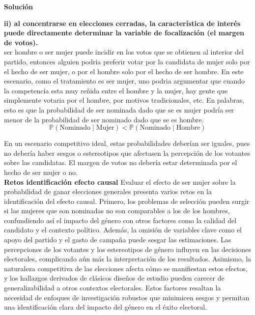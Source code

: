 \documentclass[a4paper, answers, addpoints, 11pt]{exam}
\newenvironment{solucion}{%
  \begin{mdframed}[
    backgroundcolor=blue!5,    %
    linecolor=blue!50,          %
    linewidth=2pt,              %
    leftmargin=10pt,            %
    rightmargin=8pt,           %
    topline=true,              %
    bottomline=true,            %
    roundcorner=10pt,           %
    innerleftmargin=10pt,       %
    innerrightmargin=10pt,      %
    innerbottommargin=10pt,     %
    innertopmargin=10pt         %
  ]%
  \begin{tcolorbox}[colframe=blue!50!black, colback=blue!50, coltitle=white, sharp corners=all, boxrule=1mm, width=\textwidth, halign=left, valign=center, top=0mm, bottom=0mm, left=0mm, right=0mm] \textbf{Solución} \end{tcolorbox} }{\end{mdframed}}
\begin{document}
\begin{enumerate}[resume]
\begin{solucion}
\textbf{ii) al concentrarse en elecciones cerradas, la característica de interés puede directamente
determinar la variable de focalización (el margen de votos).}\\
ser hombre o ser mujer puede incidir en los votos que se obtienen al interior del partido, entonces alguien podria preferir votar por la candidata de mujer solo por el hecho de ser mujer, o por el hombre solo por el hecho de ser hombre. En este escenario, como el tratamiento es ser mujer, uno podria argumentar que cuando la competencia esta muy reñida entre el hombre y la mujer, hay gente que simplemente votaria por el hombre, por motivos tradicionales, etc. En palabras, esto es que la probabilidad de ser nominada dado que se es mujer podría ser menor de la probabilidad de ser nominado dado que se es hombre.  \[
    \mathbb{P}(\text{Nominado} \mid \text{Mujer}) < \mathbb{P}(\text{Nominado} \mid \text{Hombre})
    \]

En un escenario competitivo ideal, estas probabilidades deberían ser iguales, pues no debería haber sesgos o estereotipos que afectasen la percepción de los votantes sobre las candidatas.  El margen de votos no debería estar determinada por el hecho de ser mujer o no.\\ 


\textbf{Retos identificación efecto causal}
 Evaluar el efecto de ser mujer sobre la probabilidad de ganar elecciones generales presenta varios retos en la identificación del efecto causal. Primero, los problemas de selección pueden surgir si las mujeres que son nominadas  no son comparables a los de los hombres, confundiendo así el impacto del género con otros factores como la calidad del candidato y el contexto político. Además, la omisión de variables clave como el apoyo del partido y el gasto de campaña puede sesgar las estimaciones. Las percepciones de los votantes y los estereotipos de género influyen en las decisiones electorales, complicando aún más la interpretación de los resultados. Asimismo, la naturaleza competitiva de las elecciones afecta cómo se manifiestan estos efectos, y los hallazgos derivados de clásicos diseños de estudio pueden carecer de generalizabilidad a otros contextos electorales. Estos factores resaltan la necesidad de enfoques de investigación robustos que minimicen sesgos y permitan una identificación clara del impacto del género en el éxito electoral.
 
\end{solucion}
\end{enumerate}
\end{document}

